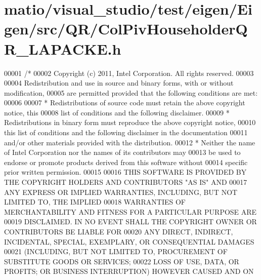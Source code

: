 \hypertarget{matio_2visual__studio_2test_2eigen_2_eigen_2src_2_q_r_2_col_piv_householder_q_r___l_a_p_a_c_k_e_8h_source}{}\section{matio/visual\+\_\+studio/test/eigen/\+Eigen/src/\+Q\+R/\+Col\+Piv\+Householder\+Q\+R\+\_\+\+L\+A\+P\+A\+C\+KE.h}
\label{matio_2visual__studio_2test_2eigen_2_eigen_2src_2_q_r_2_col_piv_householder_q_r___l_a_p_a_c_k_e_8h_source}

\begin{DoxyCode}
00001 \textcolor{comment}{/*}
00002 \textcolor{comment}{ Copyright (c) 2011, Intel Corporation. All rights reserved.}
00003 \textcolor{comment}{}
00004 \textcolor{comment}{ Redistribution and use in source and binary forms, with or without modification,}
00005 \textcolor{comment}{ are permitted provided that the following conditions are met:}
00006 \textcolor{comment}{}
00007 \textcolor{comment}{ * Redistributions of source code must retain the above copyright notice, this}
00008 \textcolor{comment}{   list of conditions and the following disclaimer.}
00009 \textcolor{comment}{ * Redistributions in binary form must reproduce the above copyright notice,}
00010 \textcolor{comment}{   this list of conditions and the following disclaimer in the documentation}
00011 \textcolor{comment}{   and/or other materials provided with the distribution.}
00012 \textcolor{comment}{ * Neither the name of Intel Corporation nor the names of its contributors may}
00013 \textcolor{comment}{   be used to endorse or promote products derived from this software without}
00014 \textcolor{comment}{   specific prior written permission.}
00015 \textcolor{comment}{}
00016 \textcolor{comment}{ THIS SOFTWARE IS PROVIDED BY THE COPYRIGHT HOLDERS AND CONTRIBUTORS "AS IS" AND}
00017 \textcolor{comment}{ ANY EXPRESS OR IMPLIED WARRANTIES, INCLUDING, BUT NOT LIMITED TO, THE IMPLIED}
00018 \textcolor{comment}{ WARRANTIES OF MERCHANTABILITY AND FITNESS FOR A PARTICULAR PURPOSE ARE}
00019 \textcolor{comment}{ DISCLAIMED. IN NO EVENT SHALL THE COPYRIGHT OWNER OR CONTRIBUTORS BE LIABLE FOR}
00020 \textcolor{comment}{ ANY DIRECT, INDIRECT, INCIDENTAL, SPECIAL, EXEMPLARY, OR CONSEQUENTIAL DAMAGES}
00021 \textcolor{comment}{ (INCLUDING, BUT NOT LIMITED TO, PROCUREMENT OF SUBSTITUTE GOODS OR SERVICES;}
00022 \textcolor{comment}{ LOSS OF USE, DATA, OR PROFITS; OR BUSINESS INTERRUPTION) HOWEVER CAUSED AND ON}

\end{DoxyCode}
